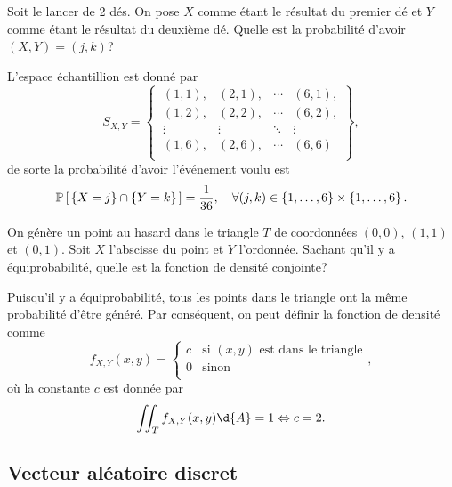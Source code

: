 \documentclass[11pt]{article}
\renewcommand\P[1]{%
	\ensuremath{%
		\mathbb{P}\left[\,#1\,\right]%
	}%
}%
\theoremstyle{remark}
\theoremstyle{definition}
\begin{document}
\begin{exemple}
	Soit le lancer de 2 dés. On pose $X$ comme étant le résultat du premier dé
	et $Y$ comme étant le résultat du deuxième dé. Quelle est la probabilité
	d'avoir $(X,Y)=(j,k)$?

	L'espace échantillion est donné par
	\begin{equation*}
		S_{X,Y}=\left\{\
			\begin{matrix}
				(1,1), & (2,1), & \cdots & (6,1),\\
				(1,2), & (2,2), & \cdots & (6,2),\\
				\vdots & \vdots & \ddots & \vdots\\
				(1,6), & (2,6), & \cdots & (6,6) \\
			\end{matrix}
		\right\},
	\end{equation*}
	de sorte la probabilité d'avoir l'événement voulu est
	\begin{equation*}
		\P{\left\{X=j\right\}\cap\left\{Y=k\right\}}=\frac{1}{36},\quad\forall
		(j,k)\in\left\{1,\dots,6\right\}\times\left\{1,\dots,6\right\}.
	\end{equation*}
\end{exemple}

\begin{exemple}
	On génère un point au hasard dans le triangle $T$ de coordonnées $(0,0)$,
	$(1,1)$ et $(0,1)$. Soit $X$ l'abscisse du point et $Y$ l'ordonnée. Sachant
	qu'il y a équiprobabilité, quelle est la fonction de densité conjointe?

	Puisqu'il y a équiprobabilité, tous les points dans le triangle ont la même
	probabilité d'être généré. Par conséquent, on peut définir la fonction de
	densité comme
	\begin{equation*}
		f_{X,Y}(x,y)=\left\{
			\begin{array}{rl}
				c&\text{si $(x,y)$ est dans le triangle}\\
				0&\text{sinon}\\
			\end{array}
		\right.,
	\end{equation*}
	où la constante $c$ est donnée par
	\begin{equation*}
		\iint_Tf_{X,Y}(x,y)\d{A}=1\Leftrightarrow c=2.
	\end{equation*}
\end{exemple}

\subsection{Vecteur aléatoire discret}
\end{document}
